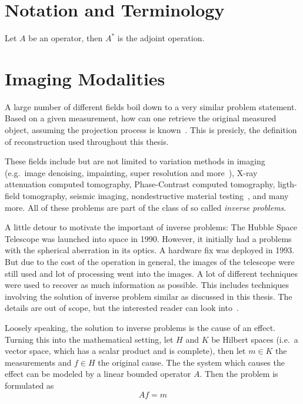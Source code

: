 \chapter{Notation and Terminology}\label{chap:notation}

Let \(A\) be an operator, then \(A^\ast\) is the adjoint operation.

\chapter{Imaging Modalities}\label{chap:imaging_modalities}

A large number of different fields boil down to a very similar problem statement. Based on a given
measurement, how can one retrieve the original measured object, assuming the projection process is
known~\cite{herman_basis_2015}. This is presicly, the definition of reconstruction used throughout
this thesis.

These fields include but are not limited to variation methods in imaging (e.g.\ image denoising,
impainting, super resolution and more~\cite{scherzer_variational_2009}), X-ray attenuation computed
tomography, Phase-Contrast computed tomography, ligth-field tomography, seismic imaging,
nondestructive material testing~\cite{carpio_inverse_2008}, and many more. All of these problems
are part of the class of so called \textit{inverse problems}.

A little detour to motivate the important of inverse problems: The Hubble Space Telescope was
launched into space in 1990. However, it initially had a problems with the spherical aberration in
its optics. A hardware fix was deployed in 1993. But due to the cost of the operation in general,
the images of the telescope were still used and lot of processing went into the images. A lot of
different techniques were used to recover as much information as possible. This includes techniques
involving the solution of inverse problem similar as discussed in this thesis. The details are out
of scope, but the interested reader can look into~\cite{white_restoration_1992,adorf_hubble_1995}.

\begin{definition}\label{def:inverse_problem}
	Loosely speaking, the solution to inverse problems is the cause of an effect. Turning this
	into the mathematical setting, let \(H\) and \(K\) be Hilbert spaces (i.e.\ a vector space,
	which has a scalar product and is complete), then let \(m \in K\) the measurements and \(f
	\in H\) the original cause. The the system which causes the effect can be modeled by a
	linear bounded operator \(A\). Then the problem is formulated as
	\[ A f = m \]
\end{definition}

